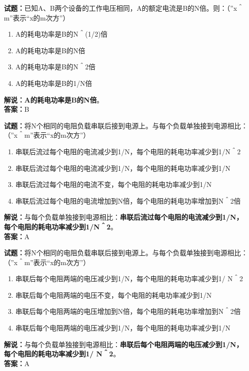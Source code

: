 \documentclass{ctexbook}
\begin{document}
\noindent\textbf{试题：}已知A、B两个设备的工作电压相同，A的额定电流是B的N倍。则：（”x＾m”表示“x的m次方”）
\begin{enumerate}[leftmargin=3em]
\item A的耗电功率是B的N＾(1/2)倍
\item A的耗电功率是B的N倍
\item A的耗电功率是B的N＾2倍
\item A的耗电功率是B的1/N倍
\end{enumerate}
\noindent\textbf{解说：}\textbf{A的耗电功率是B的N倍}。\\\noindent\textbf{答案：}B


\bigskip


\noindent\textbf{试题：}将N个相同的电阻负载串联后接到电源上。与每个负载单独接到电源相比：（”x＾m”表示“x的m次方”）
\begin{enumerate}[leftmargin=3em]
\item 串联后流过每个电阻的电流减少到1/N，每个电阻的耗电功率减少到1/N＾2
\item 串联后流过每个电阻的电流减少到1/N，每个电阻的耗电功率减少到1/N
\item 串联后流过每个电阻的电流不变，每个电阻的耗电功率减少到1/N
\item 串联后流过每个电阻的电流增加到N倍，每个电阻的耗电功率增加到N＾2倍
\end{enumerate}
\noindent\textbf{解说：}与每个负载单独接到电源相比：\textbf{串联后流过每个电阻的电流减少到1/N，每个电阻的耗电功率减少到1/N＾2}。\\\noindent\textbf{答案：}A




\bigskip


\noindent\textbf{试题：}将N个相同的电阻负载串联后接到电源上。与每个负载单独接到电源相比：（”x＾m”表示“x的m次方”）
\begin{enumerate}[leftmargin=3em]
\item 串联后每个电阻两端的电压减少到1/N，每个电阻的耗电功率减少到1/ N＾2
\item 串联后每个电阻两端的电压不变，每个电阻的耗电功率减少到1/N
\item 串联后每个电阻两端的电压增加到N倍，每个电阻的耗电功率增加到N＾2倍
\item 串联后每个电阻两端的电压减少到1/N，每个电阻的耗电功率减少到1/N
\end{enumerate}
\noindent\textbf{解说：}与每个负载单独接到电源相比：\textbf{串联后每个电阻两端的电压减少到1/N，每个电阻的耗电功率减少到1/ N＾2}。\\\noindent\textbf{答案：}A
\end{document}
